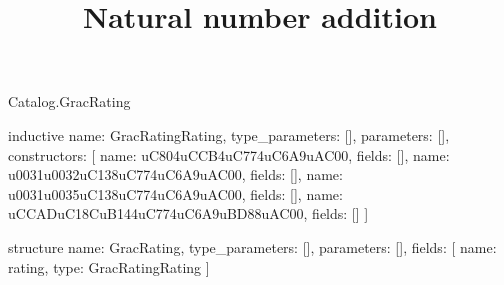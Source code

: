 \begin{lexlean}{Catalog.GracRating}
\title{Natural number addition}
\begin{semanticmodule}
inductive{
  name: GracRatingRating,
  type_parameters: [],
  parameters: [],
  constructors: [
    {name: uC804uCCB4uC774uC6A9uAC00, fields: []},
    {name: u0031u0032uC138uC774uC6A9uAC00, fields: []},
    {name: u0031u0035uC138uC774uC6A9uAC00, fields: []},
    {name: uCCADuC18CuB144uC774uC6A9uBD88uAC00, fields: []}
  ]
}

structure{
  name: GracRating,
  type_parameters: [],
  parameters: [],
  fields: [
    {name: rating, type: GracRatingRating}
  ]
}
\end{semanticmodule}
\end{lexlean}

